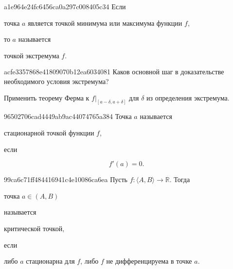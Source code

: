 \begin{note}{a1e964e24fc6456ca0a297c008405c34}
    Если \begin{icloze}{2}точка \( a \) является точкой минимума или максимума функции \( f \),\end{icloze} то \( a \) называется \begin{icloze}{1}точкой экстремума \( f \).\end{icloze}
\end{note}


\begin{note}{acfe3357868e41809070b12ea6034081}
    Каков основной шаг в доказательстве необходимого условия экстремума?

    \begin{cloze}{1}
        Применить теорему Ферма к \( f|_{[a - \delta, a + \delta]}  \) для \( \delta \) из определения экстремума.
    \end{cloze}
\end{note}

\begin{note}{96502706cad4449ab9ac44074765a384}
    Точка \( a \) называется \begin{icloze}{1}стационарной точкой функции \( f \),\end{icloze} если
    \begin{icloze}{2}\[
        f'(a) = 0.
    \]\end{icloze}
\end{note}

\begin{note}{99ca6c71ff484416941c4e10086ca6ea}
    Пусть \( f : \langle A, B \rangle \to \mathbb R \). Тогда
    \begin{icloze}{1}точка \( a \in (A, B) \)\end{icloze} называется \begin{icloze}{2}критической
    точкой,\end{icloze} если \begin{icloze}{1}либо \( a \) стационарна для \( f \), либо \(
    f \) не дифференцируема в точке \( a \).\end{icloze}
\end{note}

